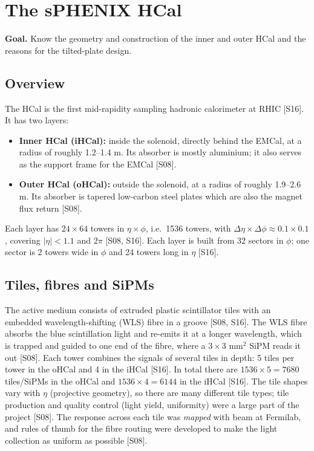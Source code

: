 \documentclass[11pt,letterpaper]{article}
\newcommand{\goal}[1]{\par\noindent\textbf{Goal.} #1\par\smallskip}
\begin{document}
\section{The sPHENIX HCal}\label{sec:hcal}
\goal{Know the geometry and construction of the inner and outer HCal and the reasons for the tilted-plate design.}

\subsection{Overview}
The HCal is the first mid-rapidity sampling hadronic calorimeter at RHIC [S16].
It has two layers:
\begin{itemize}
\item \textbf{Inner HCal (iHCal):} inside the solenoid, directly behind the EMCal, at a radius of roughly 1.2--1.4 m. Its absorber is mostly aluminium; it also serves as the support frame for the EMCal [S08].
\item \textbf{Outer HCal (oHCal):} outside the solenoid, at a radius of roughly 1.9--2.6 m. Its absorber is tapered low-carbon steel plates which are also the magnet flux return [S08].
\end{itemize}
Each layer has $24\times64$ towers in $\eta\times\phi$, i.e.\ 1536 towers, with $\Delta\eta\times\Delta\phi\approx0.1\times0.1$, covering $|\eta|<1.1$ and $2\pi$ [S08, S16].
Each layer is built from 32 sectors in $\phi$; one sector is 2 towers wide in $\phi$ and 24 towers long in $\eta$ [S16].

\subsection{Tiles, fibres and SiPMs}
The active medium consists of extruded plastic scintillator tiles with an embedded wavelength-shifting (WLS) fibre in a groove [S08, S16].
The WLS fibre absorbs the blue scintillation light and re-emits it at a longer wavelength, which is trapped and guided to one end of the fibre, where a $3\times3$ mm$^2$ SiPM reads it out [S08].
Each tower combines the signals of several tiles in depth: 5 tiles per tower in the oHCal and 4 in the iHCal [S16].
In total there are $1536\times5=7680$ tiles/SiPMs in the oHCal and $1536\times4=6144$ in the iHCal [S16].
The tile shapes vary with $\eta$ (projective geometry), so there are many different tile types; tile production and quality control (light yield, uniformity) were a large part of the project [S08].
The response across each tile was \emph{mapped} with beam at Fermilab, and rules of thumb for the fibre routing were developed to make the light collection as uniform as possible [S08].
\end{document}

